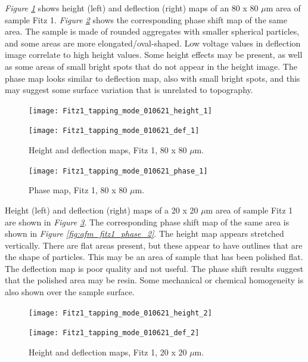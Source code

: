 
\textit{Figure \ref{fig:afm_fitz1_height_def_1}} shows height (left) and deflection (right) maps of an 80 x 80 $\mu$m area of sample Fitz 1. \textit{Figure \ref{fig:afm_fitz1_phase_1}} shows the corresponding phase shift map of the same area. The sample is made of rounded aggregates with smaller spherical particles, and some areas are more elongated/oval-shaped. Low voltage values in deflection image correlate to high height values. Some height effects may be present, as well as some areas of small bright spots that do not appear in the height image. The phase map looks similar to deflection map, also with small bright spots, and this may suggest some surface variation that is unrelated to topography.

\begin{figure}[H]
\centering
\begin{minipage}{.45\textwidth}
  \centering
  \texttt{[image: Fitz1\_tapping\_mode\_010621\_height\_1]}
\end{minipage}
\begin{minipage}{.45\textwidth}
  \centering
  \texttt{[image: Fitz1\_tapping\_mode\_010621\_def\_1]}
\end{minipage}
\caption[Height and deflection maps, Fitz 1]{Height and deflection maps, Fitz 1, 80 x 80 $\mu$m.}
\label{fig:afm_fitz1_height_def_1}
\end{figure}

\begin{figure}[H]
\centering
  \texttt{[image: Fitz1\_tapping\_mode\_010621\_phase\_1]}
\caption[Phase map, Fitz 1]{Phase map, Fitz 1, 80 x 80 $\mu$m.}
\label{fig:afm_fitz1_phase_1}
\end{figure}

Height (left) and deflection (right) maps of a 20 x 20 $\mu$m area of sample Fitz 1 are shown in \textit{Figure \ref{fig:afm_fitz1_height_def_2}}. The corresponding phase shift map of the same area is shown in \textit{Figure \ref{fig:afm_fitz1_phase_2}}. The height map appears stretched vertically. There are flat areas present, but these appear to have outlines that are the shape of particles. This may be an area of sample that has been polished flat. The deflection map is poor quality and not useful. The phase shift results suggest that the polished area may be resin. Some mechanical or chemical homogeneity is also shown over the sample surface.

\begin{figure}[H]
\centering
\begin{minipage}{.45\textwidth}
  \centering
  \texttt{[image: Fitz1\_tapping\_mode\_010621\_height\_2]}
\end{minipage}
\begin{minipage}{.45\textwidth}
  \centering
  \texttt{[image: Fitz1\_tapping\_mode\_010621\_def\_2]}
\end{minipage}
\caption[Height and deflection maps, Fitz 1]{Height and deflection maps, Fitz 1, 20 x 20 $\mu$m.}
\label{fig:afm_fitz1_height_def_2}
\end{figure}


